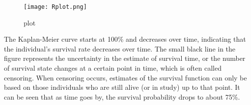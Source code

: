 \documentclass[12pt,letterpaper]{article}
\begin{document}
\begin{figure}[htbp] 
	\centering
	\texttt{[image: Rplot.png]} %
	\caption{plot}
	\label{fig:example}
\end{figure}


\noindent The Kaplan-Meier curve starts at 100\% and decreases over time, indicating that the individual's survival rate decreases over time. The small black line in the figure represents the uncertainty in the estimate of survival time, or the number of survival state changes at a certain point in time, which is often called censoring. When censoring occurs, estimates of the survival function can only be based on those individuals who are still alive (or in study) up to that point. It can be seen that as time goes by, the survival probability drops to about 75\%.
\end{document}

